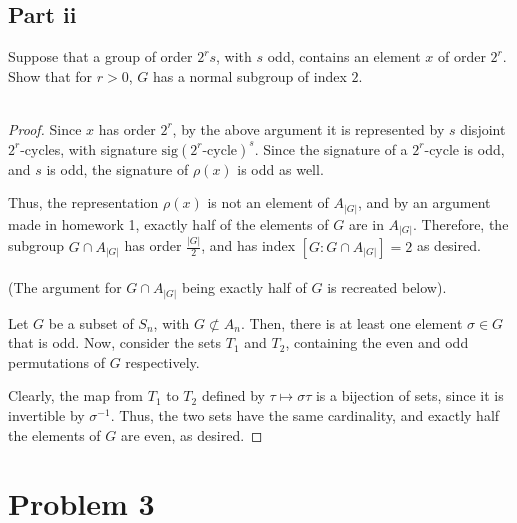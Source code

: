 \documentclass[12pt,reqno]{amsart}
\newcommand{\inv}{^{-1}}
\begin{document}
\subsection*{Part ii}
Suppose that a group of order $2^rs$, with $s$ odd, contains an element $x$ of
order $2^r$. Show that for $r>0$, $G$ has a normal subgroup of index $2$.
\\
\\
\begin{proof}
    Since $x$ has order $2^r$, by the above argument it is represented by
    $s$ disjoint $2^r$-cycles, with signature $\textrm{sig}(2^r\textrm{-cycle})^s$.
    Since the signature of a $2^r$-cycle is odd, and $s$ is odd, the signature
    of $\rho(x)$ is odd as well.

    Thus, the representation $\rho(x)$ is not an element of $A_{|G|}$, and by
    an argument made in homework 1, exactly half of the elements of $G$
    are in $A_{|G|}$. Therefore, the subgroup $G\cap A_{|G|}$ has order
    $\frac{|G|}{2}$, and has index $[G:G\cap A_{|G|}] = 2$ as desired.
    \\
    \\
    (The argument for $G\cap A_{|G|}$ being exactly half of $G$ is recreated
    below).

    Let $G$ be a subset of $S_n$, with $G\not\subset A_n$. Then, there is
    at least one element $\sigma\in G$ that is odd. Now, consider the sets
    $T_1$ and $T_2$, containing the even and odd permutations of $G$
    respectively.
    
    Clearly, the map from $T_1$ to $T_2$ defined by $\tau\mapsto\sigma\tau$
    is a bijection of sets, since it is invertible by $\sigma\inv$.
    Thus, the two sets have the same cardinality, and exactly half the elements
    of $G$ are even, as desired.
\end{proof}

\newpage

\section*{Problem 3}
\end{document}
